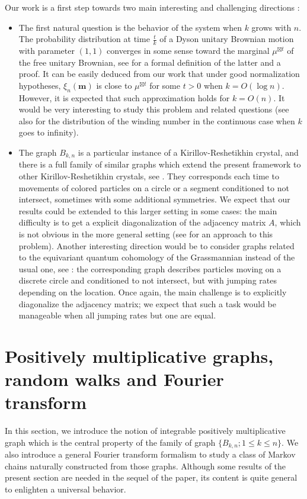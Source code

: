 \documentclass[10pt,11pt]{amsart}%
\begin{document}
Our work is a first step towards two main interesting and challenging directions :
\begin{itemize}
\item The first natural question is the behavior of the system when $k$ grows with $n$. The probability distribution at time $\frac{t}{k}$ of a Dyson unitary Brownian motion with parameter $(1,1)$ converges in some sense toward the marginal $\mu^{\boxtimes t}$ of the free unitary Brownian, see \cite{Bi2} for a formal definition of the latter and a proof. It can be easily deduced from our work that under good normalization hypotheses, $\xi_n(\mathbf{m})$ is close to $\mu^{\boxtimes t}$ for some $t>0$ when $k=O(\log n)$. However, it is expected that such approximation holds for $k=O(n)$. It would be very interesting to study this problem and related questions (see also \cite{LW} for the distribution of the winding number in the continuous case when $k$ goes to infinity).
\item The graph $B_{k,n}$ is a particular instance of a Kirillov-Reshetikhin crystal, and there is a full family of similar graphs which extend the present framework to other Kirillov-Reshetikhin crystals, see \cite{GLT2}. They corresponds each time to movements of colored particles on a circle or a segment conditioned to not intersect, sometimes with some additional symmetries. We expect that our results could be extended to this larger setting in some cases: the main difficulty is to get a explicit diagonalization of the adjacency matrix $A$, which is not obvious in the more general setting (see \cite{Kos} for an approach to this problem). Another interesting direction would be to consider graphs related to the equivariant quantum cohomology of the Grassmannian instead of the usual one, see \cite{Bu}: the corresponding graph describes particles moving on a discrete circle and conditioned to not intersect, but with jumping rates depending on the location. Once again, the main challenge is to explicitly diagonalize the adjacency matrix; we expect that such a task would be manageable when all jumping rates but one are equal.
\end{itemize}
\section{Positively multiplicative graphs, random walks and Fourier transform}\label{sec:pm_graph}
In this section, we introduce the notion of integrable positively multiplicative graph which is the central property of the family of graph $\{B_{k,n}; 1\leq k\leq n\}$. We also introduce a general Fourier transform formalism to study a class of Markov chains naturally constructed from those graphs. Although some results of the present section are needed in the sequel of the paper, its content is quite general to enlighten a universal behavior.
\end{document}

